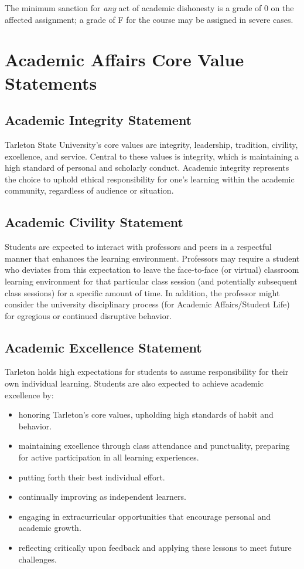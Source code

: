 \documentclass[10pt]{article}
\begin{document}
The minimum sanction for \emph{any} act of academic dishonesty is a grade of 0 on the affected assignment; a grade of F for the course may be assigned in severe cases.

\section*{Academic Affairs Core Value Statements}
\label{sec:org9cc08b7}
\subsection*{Academic Integrity Statement}
\label{sec:org41ccf65}
Tarleton State University's core values are integrity, leadership, tradition, civility, excellence, and service.  Central to these values is integrity, which is maintaining a high standard of personal and scholarly conduct.  Academic integrity represents the choice to uphold ethical responsibility for one’s learning within the academic community, regardless of audience or situation.

\subsection*{Academic Civility Statement}
\label{sec:org712c7e5}
Students are expected to interact with professors and peers in a respectful manner that enhances the learning environment. Professors may require a student who deviates from this expectation to leave the face-to-face (or virtual) classroom learning environment for that particular class session (and potentially subsequent class sessions) for a specific amount of time. In addition, the professor might consider the university disciplinary process (for Academic Affairs/Student Life) for egregious or continued disruptive behavior.

\subsection*{Academic Excellence Statement}
\label{sec:org23f73ae}
Tarleton holds high expectations for students to assume responsibility for their own individual learning. Students are also expected to achieve academic excellence by:
\begin{itemize}
\item honoring Tarleton’s core values, upholding high standards of habit and behavior.
\item maintaining excellence through class attendance and punctuality, preparing for active participation in all learning experiences.
\item putting forth their best individual effort.
\item continually improving as independent learners.
\item engaging in extracurricular opportunities that encourage personal and academic growth.
\item reflecting critically upon feedback and applying these lessons to meet future challenges.
\end{itemize}
\end{document}
